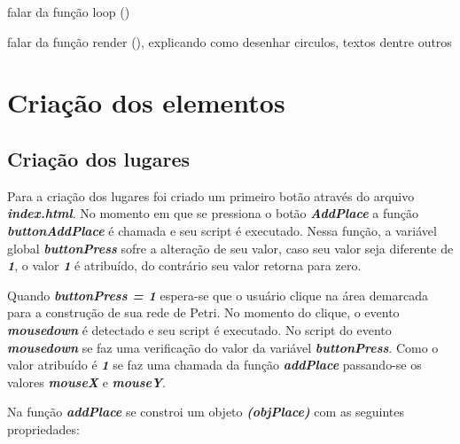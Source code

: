 \documentclass[
	12pt,				%
	openright,			%
	oneside,			%
	a4paper,			%
	english,			%
	brazil				%
	]{abntex2}
\begin{document}
falar da função loop () 

falar da função render (), explicando como desenhar circulos, textos dentre outros

\section{Criação dos elementos}


\subsection*{Criação dos lugares}

Para a criação dos lugares foi criado um primeiro botão através do arquivo \textit{\textbf{index.html}}. No momento em que se pressiona o botão \textit{\textbf{AddPlace}} a função \textit{\textbf{buttonAddPlace}} é chamada e seu script é executado. Nessa função, a variável global \textit{\textbf{buttonPress}} sofre a alteração de seu valor, caso seu valor seja diferente de \textit{\textbf{1}}, o valor \textit{\textbf{1}} é atribuído, do contrário seu valor retorna para zero.



Quando \textit{\textbf{buttonPress = 1}} espera-se que o usuário clique na área demarcada para a construção de sua rede de Petri. No momento do clique, o evento \textit{\textbf{mousedown}} é detectado e seu script é executado. No script do evento \textit{\textbf{mousedown}} se faz uma verificação do valor da variável \textit{\textbf{buttonPress}}. Como o valor atribuído é \textit{\textbf{1}} se faz uma chamada da função \textit{\textbf{addPlace}} passando-se os valores \textbf{\textit{mouseX}} e \textbf{\textit{mouseY}}. 



Na função \textbf{\textit{addPlace}} se constroi um objeto \textbf{\textit{(objPlace)}} com as seguintes propriedades: 
\end{document}
